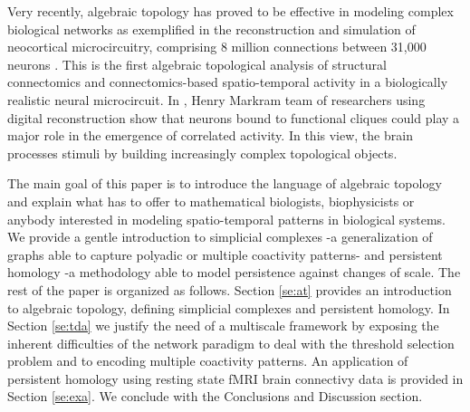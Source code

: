 \documentclass[onecollarge,runningheads]{svjour2}
\begin{document}
Very recently, algebraic topology has proved to be effective in modeling complex biological networks as exemplified in the reconstruction and simulation of neocortical microcircuitry, comprising 8 million connections between 31,000 neurons \cite{markram2015reconstruction}. This is the first algebraic topological analysis of structural connectomics and connectomics-based spatio-temporal activity in a biologically realistic neural microcircuit.  In \cite{reimann2017cliques}, Henry Markram team of researchers using digital reconstruction show that neurons bound to functional cliques could play a major role in the emergence of correlated activity. In this view, the brain processes stimuli by building increasingly complex topological objects.

The main goal of this paper is to introduce the language of algebraic topology and explain what has to offer to mathematical biologists, biophysicists or anybody interested in modeling spatio-temporal patterns in biological systems.
We provide a gentle introduction to simplicial complexes -a generalization of graphs able to capture polyadic or multiple coactivity patterns- and persistent  homology -a methodology able to model persistence against changes of scale.
The rest of the paper is organized as follows. Section \ref{se:at} provides an introduction to algebraic topology, defining simplicial complexes and persistent homology.
In Section \ref{se:tda} we justify the need of a multiscale framework by exposing the inherent difficulties of the network paradigm to deal with the threshold selection problem and to encoding multiple coactivity patterns. 
An application of persistent homology using resting state fMRI brain connectivy data is provided in Section \ref{se:exa}. We conclude with the Conclusions and Discussion section.

\end{document}
